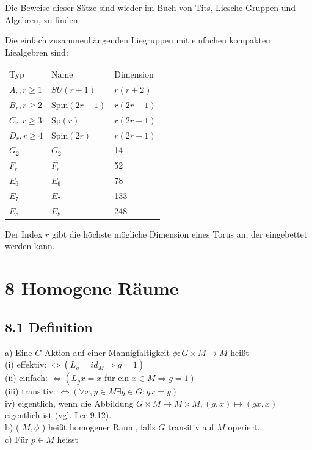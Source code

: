 \documentclass[10pt, letterpaper]{article}
\begin{document}
Die Beweise dieser Sätze sind wieder im Buch von Tits, Liesche Gruppen und Algebren, zu finden.

Die einfach zusammenhängenden Liegruppen mit einfachen kompakten Liealgebren sind:

\begin{center}
\begin{tabular}{lll}
Typ & Name & Dimension \\
$A_{r}, r \geq 1$ & $S U(r+1)$ & $r(r+2)$ \\
$B_{r}, r \geq 2$ & $\mathrm{Spin}(2 r+1)$ & $r(2 r+1)$ \\
$C_{r}, r \geq 3$ & $\mathrm{Sp}(r)$ & $r(2 r+1)$ \\
$D_{r}, r \geq 4$ & $\mathrm{Spin}(2 r)$ & $r(2 r-1)$ \\
$G_{2}$ & $G_{2}$ & 14 \\
$F_{r}$ & $F_{r}$ & 52 \\
$E_{6}$ & $E_{6}$ & 78 \\
$E_{7}$ & $E_{7}$ & 133 \\
$E_{8}$ & $E_{8}$ & 248 \\
\end{tabular}
\end{center}

Der Index $r$ gibt die höchste mögliche Dimension eines Torus an, der eingebettet werden kann.

\section*{8 Homogene Räume}
\subsection*{8.1 Definition}
a) Eine $G$-Aktion auf einer Mannigfaltigkeit $\phi: G \times M \rightarrow M$ heißt\\
(i) effektiv: $\Leftrightarrow\left(L_{g}=i d_{M} \Rightarrow g=1\right)$\\
(ii) einfach: $\Leftrightarrow\left(L_{g} x=x\right.$ für ein $\left.x \in M \Rightarrow g=1\right)$\\
(iii) transitiv: $\Leftrightarrow(\forall x, y \in M \exists g \in G: g x=y)$\\
iv) eigentlich, wenn die Abbildung $G \times M \rightarrow M \times M,(g, x) \mapsto(g x, x)$ eigentlich ist (vgl. Lee 9.12).\\
b) ( $M, \phi$ ) heißt homogener Raum, falls $G$ transitiv auf $M$ operiert.\\
c) Für $p \in M$ heisst
\end{document}
